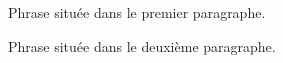 \documentclass{article}
\begin{document}
Phrase située dans le premier paragraphe. \par
Phrase située dans le deuxième paragraphe.
\end{document}

